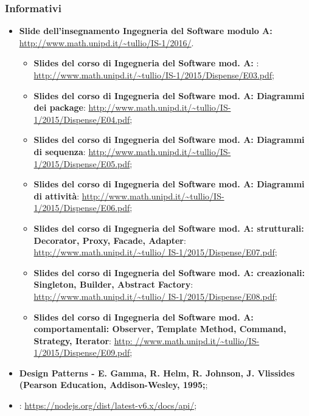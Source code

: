 \subsubsection{Informativi}
\begin{itemize}
	\item \textbf{Slide dell'insegnamento Ingegneria del Software modulo A:} \\
		\url{http://www.math.unipd.it/~tullio/IS-1/2016/}. \\
\begin{itemize}
\item \textbf{Slides del corso di Ingegneria del Software mod. A: }:
\url{http://www.math.unipd.it/~tullio/IS-1/2015/Dispense/E03.pdf};

\item  \textbf{Slides del corso di Ingegneria del Software mod. A: Diagrammi dei package}:
\url{http://www.math.unipd.it/~tullio/IS-1/2015/Dispense/E04.pdf};

\item \textbf{Slides del corso di Ingegneria del Software mod. A: Diagrammi di sequenza}:
\url{http://www.math.unipd.it/~tullio/IS-1/2015/Dispense/E05.pdf};

\item \textbf{Slides del corso di Ingegneria del Software mod. A: Diagrammi di attività}:
\url{http://www.math.unipd.it/~tullio/IS-1/2015/Dispense/E06.pdf};

\item \textbf{Slides del corso di Ingegneria del Software mod. A:  strutturali:
Decorator, Proxy, Facade, Adapter}:\url{ http://www.math.unipd.it/~tullio/
IS-1/2015/Dispense/E07.pdf};

\item \textbf{Slides del corso di Ingegneria del Software mod. A:  creazionali:
Singleton, Builder, Abstract Factory}: \url{http://www.math.unipd.it/~tullio/
IS-1/2015/Dispense/E08.pdf};

\item \textbf{Slides del corso di Ingegneria del Software mod. A:  comportamentali:
Observer, Template Method, Command, Strategy, Iterator}: \url{http:
//www.math.unipd.it/~tullio/IS-1/2015/Dispense/E09.pdf};
\end{itemize}

\item \textbf{Design Patterns - E. Gamma, R. Helm, R. Johnson, J. Vlissides (Pearson Education, Addison-Wesley, 1995;};
\item \textbf{}: \url{https://nodejs.org/dist/latest-v6.x/docs/api/};


\end{itemize}
